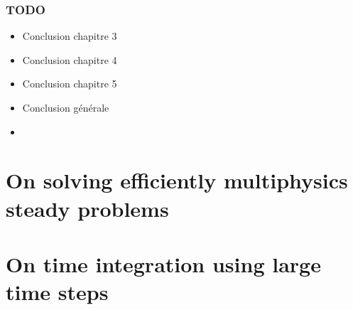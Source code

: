 



\makeflyleaf
{}

\tableofcontents
{}



\section*{TODO}
\begin{itemize}
  \item Conclusion chapitre 3
  \item Conclusion chapitre 4
  \item Conclusion chapitre 5
  \item Conclusion générale
  \item {}
\end{itemize}


\part{On solving efficiently multiphysics steady problems}

  

  

  

\part{On time integration using large time steps}

    

    









